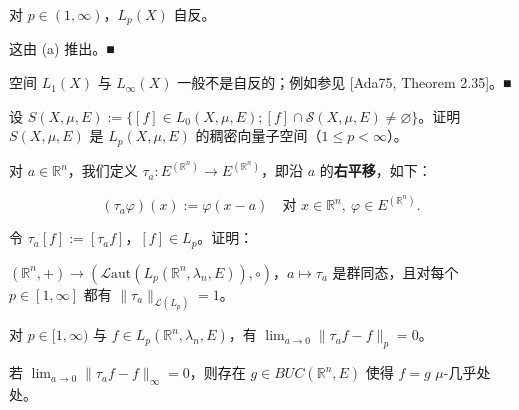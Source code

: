 \begin{remark}
\begin{items}
\item

对 $ p \in (1,\infty) $，$ L_p(X) $ 自反。

\proofhead
这由 (a) 推出。\nobreak\hspace{0.35em}■
\item

空间 $ L_1(X) $ 与 $ L_\infty(X) $ 一般不是自反的；例如参见 [Ada75, Theorem 2.35]。\nobreak\hspace{0.35em}■

\end{items}

\end{remark}

\exerciseshead

\begin{exercises}
\item

设 $ S(X,\mu,E) := \{ [f] \in L_0(X,\mu,E) ; [f] \cap \mathcal{S}(X,\mu,E) \ne \varnothing \} $。证明 $ S(X,\mu,E) $ 是 $ L_p(X,\mu,E) $ 的稠密向量子空间（$ 1 \le p < \infty $）。

\item

对 $ a \in \mathbb{R}^n $，我们定义 $ \tau_a: E^{(\mathbb{R}^n)} \to E^{(\mathbb{R}^n)} $，即沿 $ a $ 的\textbf{右平移}，如下：

\[
(\tau_a\varphi)(x) := \varphi(x-a) \quad \text{对 } x \in \mathbb{R}^n, \ \varphi \in E^{(\mathbb{R}^n)} .
\]

令 $ \tau_a[f] := [\tau_a f] $，$ [f] \in L_p $。证明：

\begin{subitems}
\item

$ (\mathbb{R}^n,+) \to (\mathcal{L}\mathrm{aut}(L_p(\mathbb{R}^n,\lambda_n,E)),\circ) $，$ a \mapsto \tau_a $ 是群同态，且对每个 $ p \in [1,\infty] $ 都有 $ \|\tau_a\|_{\mathcal{L}(L_p)} = 1 $。

\item

对 $ p \in [1,\infty) $ 与 $ f \in L_p(\mathbb{R}^n,\lambda_n,E) $，有 $ \lim_{a\to0}\|\tau_a f - f\|_p = 0 $。

\item

若 $ \lim_{a\to0}\|\tau_a f - f\|_\infty = 0 $，则存在 $ g \in BUC(\mathbb{R}^n,E) $ 使得 $ f = g $ $ \mu $-几乎处处。

\end{subitems}


\end{exercises}
